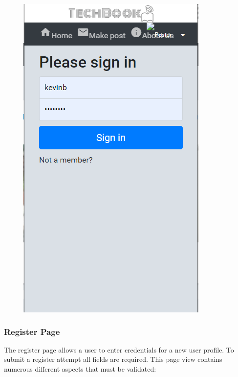 \begin{figure}[H]
\begin{minipage}{.25\textwidth}
  \includegraphics[width=.9\linewidth]{img/ui/login_MOBILE.PNG}
  \label{fig:loginMOBILE}
\end{minipage}
\end{figure}

\subsubsection{Register Page}
The register page allows a user to enter credentials for a new user profile. To submit a register attempt all fields are required. This page view contains numerous different aspects that must be validated:


